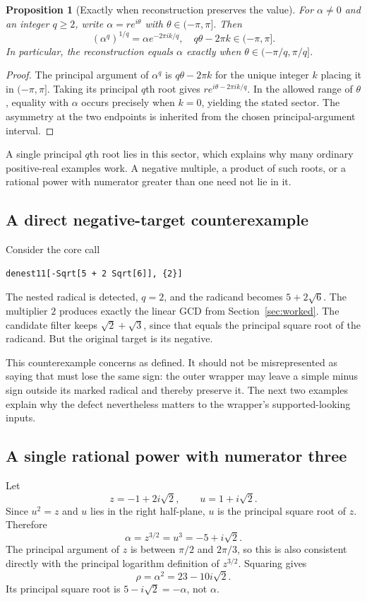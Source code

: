 \documentclass[11pt,letterpaper]{article}
\newcommand{\code}[1]{\texttt{\detokenize{#1}}}
\newtheorem{proposition}{Proposition}[section]
\theoremstyle{definition}
\begin{document}
\begin{proposition}[Exactly when reconstruction preserves the value]
For $\alpha\ne0$ and an integer $q\ge2$, write
$\alpha=re^{i\theta}$ with $\theta\in(-\pi,\pi]$. Then
\begin{equation}
 (\alpha^q)^{1/q}=\alpha e^{-2\pi i k/q},
 \quad q\theta-2\pi k\in(-\pi,\pi].
 \label{eq:phase}
\end{equation}
In particular, the reconstruction equals $\alpha$ exactly when
$\theta\in(-\pi/q,\pi/q]$.
\end{proposition}
\begin{proof}
The principal argument of $\alpha^q$ is $q\theta-2\pi k$ for the unique integer $k$
placing it in $(-\pi,\pi]$. Taking its principal $q$th root gives
$r e^{i\theta-2\pi i k/q}$. In the allowed range of $\theta$, equality with $\alpha$
occurs precisely when $k=0$, yielding the stated sector. The asymmetry at the two
endpoints is inherited from the chosen principal-argument interval.
\end{proof}
A single principal $q$th root lies in this sector, which explains why many
ordinary positive-real examples work. A negative multiple, a product of such roots,
or a rational power with numerator greater than one need not lie in it.

\subsection{A direct negative-target counterexample}
Consider the core call
\begin{lstlisting}
denest11[-Sqrt[5 + 2 Sqrt[6]], {2}]
\end{lstlisting}
The nested radical is detected, $q=2$, and the radicand becomes $5+2\sqrt6$.
The multiplier $2$ produces exactly the linear GCD from Section~\ref{sec:worked}.
The candidate filter keeps $\sqrt2+\sqrt3$, since that equals the principal square
root of the radicand. But the original target is its negative.

This counterexample concerns \code{denest11} as defined. It should not be
misrepresented as saying that \code{Strad[-Sqrt[...]]} must lose the same sign:
the outer wrapper may leave a simple minus sign outside its marked radical and
thereby preserve it. The next two examples explain why the defect nevertheless
matters to the wrapper's supported-looking inputs.

\subsection{A single rational power with numerator three}
Let
\[
 z=-1+2i\sqrt2,
 \qquad u=1+i\sqrt2.
\]
Since $u^2=z$ and $u$ lies in the right half-plane, $u$ is the principal square root
of $z$. Therefore
\begin{equation}
 \alpha=z^{3/2}=u^3=-5+i\sqrt2.
 \label{eq:threehalf}
\end{equation}
The principal argument of $z$ is between $\pi/2$ and $2\pi/3$, so this is also
consistent directly with the principal logarithm definition of $z^{3/2}$.
Squaring gives
\[
 \rho=\alpha^2=23-10i\sqrt2.
\]
Its principal square root is $5-i\sqrt2=-\alpha$, not $\alpha$.
\end{document}
